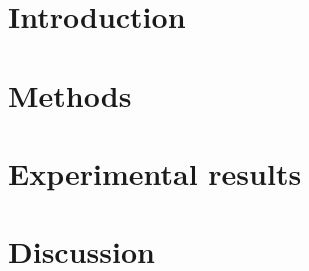 \documentclass[twoside, a4paper, fleqn, reqno]{article}
\begin{document}
\maketitle

\section*{Introduction}

\section*{Methods}

\section*{Experimental results}

\section*{Discussion}
\end{document}

